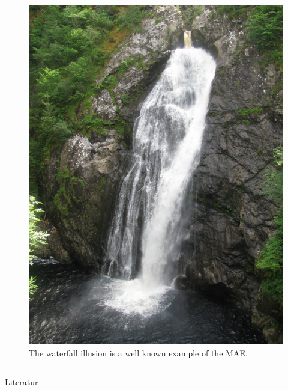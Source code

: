 \documentclass[xcolor={fixpdftex,hyperref,x11names},10pt,pdftex,hyperref={pdftex}]{beamer}
\begin{document}
\begin{frame}
\begin{columns}[t]
\begin{column}{0.3\textwidth}
\begin{figure}[h]
          \includegraphics[width=\textwidth]{./bilder/waterfall.png}
          \caption{The waterfall illusion is a well known example of the MAE.}
          \label{fig:waterfall}
        \end{figure}
      \end{column}
  \end{columns}
\end{frame}

\begin{frame}{Literatur}
    \nocite{kanai_perceptual_2005}
    
    
    \normalsize%
\end{frame}
\end{document}
